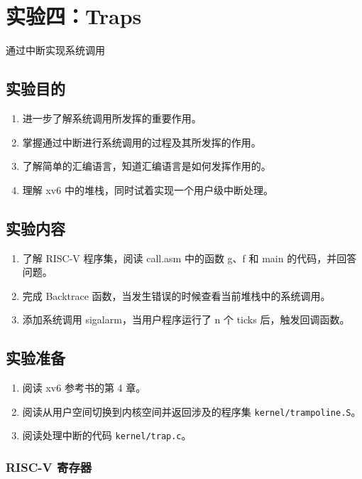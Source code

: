 \section{实验四：Traps}\label{sec:Traps}

通过中断实现系统调用

\subsection{实验目的}

\begin{enumerate}
	\item 进一步了解系统调用所发挥的重要作用。
	\item 掌握通过中断进行系统调用的过程及其所发挥的作用。
	\item 了解简单的汇编语言，知道汇编语言是如何发挥作用的。
	\item 理解 xv6 中的堆栈，同时试着实现一个用户级中断处理。
\end{enumerate}

\subsection{实验内容}

\begin{enumerate}
	\item 了解 RISC-V 程序集，阅读 call.asm 中的函数 g、f 和 main 的代码，并回答问题。
	\item 完成 Backtrace 函数，当发生错误的时候查看当前堆栈中的系统调用。
	\item 添加系统调用 sigalarm，当用户程序运行了 n 个 ticks 后，触发回调函数。
\end{enumerate}

\subsection{实验准备}

\begin{enumerate}
	\item 阅读 xv6 参考书的第 4 章。
	\item 阅读从用户空间切换到内核空间并返回涉及的程序集 \texttt{kernel/trampoline.S}。
	\item 阅读处理中断的代码 \texttt{kernel/trap.c}。
\end{enumerate}

\subsubsection{RISC-V 寄存器}

